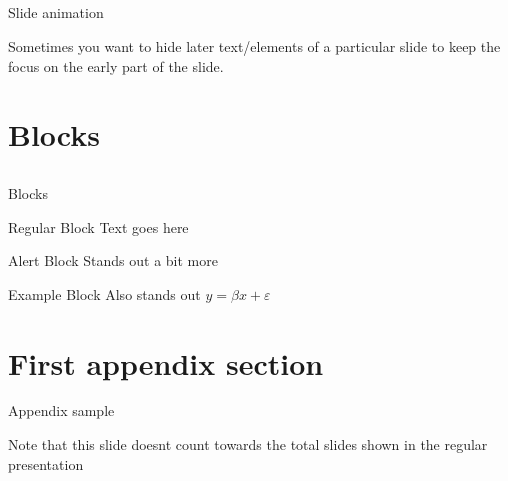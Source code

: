 \documentclass[12pt]{beamer}
\begin{document}
\subsection{}
\begin{frame}{Slide animation}

	Sometimes you want to hide later text/elements of a particular slide to keep the focus on the early part of the slide.

	\bigskip


\end{frame}



\section{Blocks}
\subsection{}
\begin{frame}{Blocks}

	\begin{block}{Regular Block}
		Text goes here
	\end{block}

	\begin{alertblock}{Alert Block}
		Stands out a bit more
	\end{alertblock}

	\begin{exampleblock}{Example Block}
		Also stands out $y=\beta x+ \varepsilon$
	\end{exampleblock}

\end{frame}



\appendix

{\BackgroundShaded
\begin{frame}
\end{frame}
}



\section{First appendix section}

\begin{frame}{Appendix sample}

	Note that this slide doesnt count towards the total slides shown in the regular presentation

\end{frame}



\end{document}
